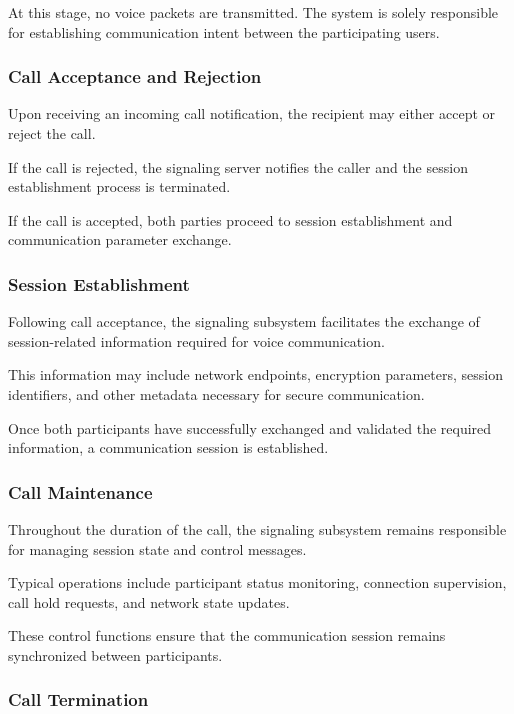 At this stage, no voice packets are transmitted. The system is solely responsible for establishing communication intent between the participating users.

\subsubsection{Call Acceptance and Rejection}

Upon receiving an incoming call notification, the recipient may either accept or reject the call.

If the call is rejected, the signaling server notifies the caller and the session establishment process is terminated.

If the call is accepted, both parties proceed to session establishment and communication parameter exchange.

\subsubsection{Session Establishment}

Following call acceptance, the signaling subsystem facilitates the exchange of session-related information required for voice communication.

This information may include network endpoints, encryption parameters, session identifiers, and other metadata necessary for secure communication.

Once both participants have successfully exchanged and validated the required information, a communication session is established.

\subsubsection{Call Maintenance}

Throughout the duration of the call, the signaling subsystem remains responsible for managing session state and control messages.

Typical operations include participant status monitoring, connection supervision, call hold requests, and network state updates.

These control functions ensure that the communication session remains synchronized between participants.

\subsubsection{Call Termination}

